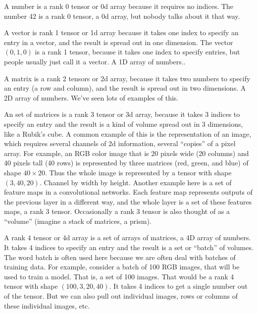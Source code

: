 A number is a rank 0 tensor or 0d array because it requires no indices.  The number 42 is a rank 0 tensor, a 0d array, but nobody talks about it that way.  

A vector is rank 1 tensor or 1d array because it takes one index to specify an entry in a vector, and the result is spread out in one dimension.  The vector $(0,1,0)$ is a rank 1 tensor, because it takes one index to specify entries, but people usually just call it a vector. A 1D array of numbers..

A matrix is a rank 2 tensors or 2d array, because it takes two numbers to specify an entry (a row and column), and the result is spread out in two dimensions. A 2D array of numbers. We've seen lots of examples of this.

An set of matrices is a rank 3 tensor or 3d array, because it takes 3 indices to specify an entry and the result is a kind of volume spread out in 3 dimensions, like a Rubik's cube. A common example of this is the representation of an image, which requires several channels of 2d information, several ``copies'' of a pixel array.  For example, an RGB color image that is 20 pixels wide (20 columns) and 40 pixels tall (40 rows) is represented by three matrices (red, green, and blue) of shape $40 \times 20$. Thus the whole image is represented by a tensor with shape $(3,40,20)$. Channel by width by height.  Another example here is a set of feature maps in a convolutional networks. Each feature map represents outputs of the previous layer in a different way, and the whole layer is a set of these features maps, a rank 3 tensor. Occasionally a rank 3 tensor is also thought of as a ``volume'' (imagine a stack of matrices, a prism).

 
 A rank 4 tensor or 4d array is a set of arrays of matrices, a 4D array of numbers. It takes 4 indices to specify an entry and the result is a set or ``batch'' of volumes. The word batch is often used here because we are often deal with batches of training data.  For example, consider a batch of 100 RGB images, that will be used to train a model. That is, a set of 100 images. That would be a rank 4 tensor with shape $(100,3,20,40)$. It takes 4 indices to get a single number out of the tensor.  But we can also pull out individual images, rows or columns of these individual images, etc.
 
 

